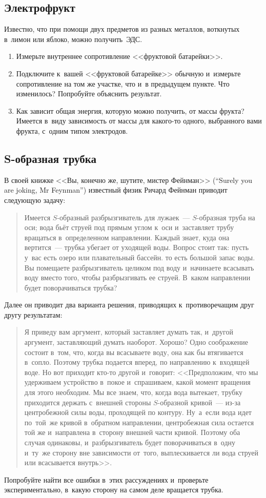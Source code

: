 \documentclass[a4paper,12pt]{article}
\begin{document}
\subsection{Электрофрукт}
Известно, что при помощи двух предметов из разных металлов, воткнутых в~лимон или яблоко, можно получить~ЭДС.
\begin{enumerate}
 \item Измерьте внутреннее сопротивление <<фруктовой батарейки>>.

 \item Подключите к~вашей  <<фруктовой батарейке>> обычную и~измерьте сопротивление на том же участке,
 что и~в предыдущем пункте. Что изменилось? Попробуйте объяснить результат.

 \item Как зависит общая энергия, которую можно получить, от массы фрукта? Имеется в~виду зависимость
 от массы для какого-то одного, выбранного вами фрукта, с~одним типом электродов.
\end{enumerate}

\subsection{S-образная трубка}
В своей книжке <<Вы, конечно же, шутите, мистер Фейнман>> (``Surely you are joking, Mr Feynman'')
известный физик Ричард Фейнман приводит следующую задачу:
\begin{quote} Имеется $S$-образный разбрызгиватель для лужаек~--- $S$-образная труба на оси;
вода бьёт струей под прямым углом к~оси и~заставляет трубу вращаться в~определенном направлении.
Каждый знает, куда она вертится~--- трубка убегает от уходящей воды. Вопрос стоит так: пусть у~вас
есть озеро или плавательный бассейн. то есть большой запас воды. Вы помещаете разбрызгиватель целиком
под воду и~начинаете всасывать воду вместо того, чтобы разбрызгивать ее струей. В~каком направлении
будет поворачиваться трубка?
\end{quote}
Далее он приводит два варианта решения, приводящих к~противоречащим друг другу результатам:
\begin{quote}
Я приведу вам аргумент, который заставляет думать так, и~другой аргумент, заставляющий думать наоборот. Хорошо?
Одно соображение состоит в~том, что, когда вы всасываете воду, она как бы втягивается в~сопло.
Поэтому трубка подается вперед, по направлению к~входящей воде.
Но вот приходит кто-то другой и~говорит: <<Предположим, что мы удерживаем устройство в~покое и~спрашиваем,
какой момент вращения для этого необходим. Мы все знаем, что, когда вода вытекает, трубку приходится
держать с~внешней стороны $S$-образной кривой~--- из-за центробежной силы воды, проходящей по контуру.
\hbox{Ну~а~если} вода идет по~той~же кривой в~обратном направлении, центробежная сила остается той же
и~направлена в~сторону внешней части кривой. Поэтому оба случая одинаковы, и~разбрызгиватель
будет поворачиваться в~одну и~ту~же сторону вне зависимости от~того, выплескивается ли вода
струей или всасывается внутрь>>.
\end{quote}
Попробуйте найти все ошибки в~этих рассуждениях и~проверьте экспериментально,
в~какую сторону на самом деле вращается трубка.
\end{document}
